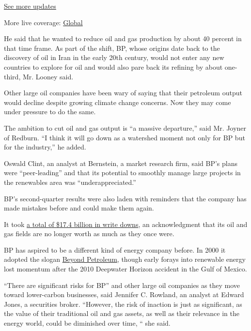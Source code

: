 \href{https://www.nytimes3xbfgragh.onion/live/2020/08/20/business/stock-market-today-coronavirus?action=click\&pgtype=Article\&state=default\&region=MAIN_CONTENT_1\&context=storylines_live_updates}{See
more updates}

More live coverage:
\href{https://www.nytimes3xbfgragh.onion/2020/08/20/world/coronavirus-covid.html?action=click\&pgtype=Article\&state=default\&region=MAIN_CONTENT_1\&context=storylines_live_updates}{Global}

He said that he wanted to reduce oil and gas production by about 40
percent in that time frame. As part of the shift, BP, whose origins date
back to the discovery of oil in Iran in the early 20th century, would
not enter any new countries to explore for oil and would also pare back
its refining by about one-third, Mr. Looney said.

Other large oil companies have been wary of saying that their petroleum
output would decline despite growing climate change concerns. Now they
may come under pressure to do the same.

The ambition to cut oil and gas output is ``a massive departure,'' said
Mr. Joyner of Redburn. ``I think it will go down as a watershed moment
not only for BP but for the industry,'' he added.

Oswald Clint, an analyst at Bernstein, a market research firm, said BP's
plans were ``peer-leading'' and that its potential to smoothly manage
large projects in the renewables area was ``underappreciated.''

BP's second-quarter results were also laden with reminders that the
company has made mistakes before and could make them again.

It took
\href{https://www.nytimes3xbfgragh.onion/2020/06/15/business/energy-environment/bp-oil-gas-write-down.html}{a
total of \$17.4 billion in write downs}, an acknowledgment that its oil
and gas fields are no longer worth as much as they once were.

BP has aspired to be a different kind of energy company before. In 2000
it adopted the slogan
\href{https://www.nytimes3xbfgragh.onion/2002/12/08/magazine/how-green-is-bp.html}{Beyond
Petroleum}, though early forays into renewable energy lost momentum
after the 2010 Deepwater Horizon accident in the Gulf of Mexico.

``There are significant risks for BP'' and other large oil companies as
they move toward lower-carbon businesses, said Jennifer C. Rowland, an
analyst at Edward Jones, a securities broker. ``However, the risk of
inaction is just as significant, as the value of their traditional oil
and gas assets, as well as their relevance in the energy world, could be
diminished over time, `` she said.

